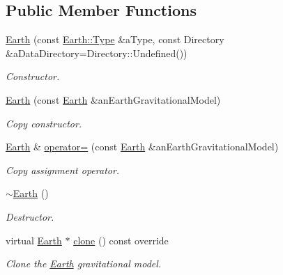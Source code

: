 \subsection*{Public Member Functions}
\begin{DoxyCompactItemize}
\item 
\hyperlink{classlibrary_1_1physics_1_1environment_1_1gravitational_1_1_earth_a11a143d30e7ced44b805bd55c70b1299}{Earth} (const \hyperlink{classlibrary_1_1physics_1_1environment_1_1gravitational_1_1_earth_ab20a2b260831c66ac10f7b9a307d25ca}{Earth\+::\+Type} \&a\+Type, const Directory \&a\+Data\+Directory=Directory\+::\+Undefined())
\begin{DoxyCompactList}\small\item\em Constructor. \end{DoxyCompactList}\item 
\hyperlink{classlibrary_1_1physics_1_1environment_1_1gravitational_1_1_earth_a55f57c8c64dcac3a74597f8f978d3841}{Earth} (const \hyperlink{classlibrary_1_1physics_1_1environment_1_1gravitational_1_1_earth}{Earth} \&an\+Earth\+Gravitational\+Model)
\begin{DoxyCompactList}\small\item\em Copy constructor. \end{DoxyCompactList}\item 
\hyperlink{classlibrary_1_1physics_1_1environment_1_1gravitational_1_1_earth}{Earth} \& \hyperlink{classlibrary_1_1physics_1_1environment_1_1gravitational_1_1_earth_a2b58f2040af5b0e6180e1dbb8c9b9ee8}{operator=} (const \hyperlink{classlibrary_1_1physics_1_1environment_1_1gravitational_1_1_earth}{Earth} \&an\+Earth\+Gravitational\+Model)
\begin{DoxyCompactList}\small\item\em Copy assignment operator. \end{DoxyCompactList}\item 
\hyperlink{classlibrary_1_1physics_1_1environment_1_1gravitational_1_1_earth_a5780296ed772dd730c657df51ded8b0c}{$\sim$\+Earth} ()
\begin{DoxyCompactList}\small\item\em Destructor. \end{DoxyCompactList}\item 
virtual \hyperlink{classlibrary_1_1physics_1_1environment_1_1gravitational_1_1_earth}{Earth} $\ast$ \hyperlink{classlibrary_1_1physics_1_1environment_1_1gravitational_1_1_earth_af49bd5f4dda5dc344a60240bfc7bc820}{clone} () const override
\begin{DoxyCompactList}\small\item\em Clone the \hyperlink{classlibrary_1_1physics_1_1environment_1_1gravitational_1_1_earth}{Earth} gravitational model. \end{DoxyCompactList}\item 

\end{DoxyCompactItemize}
